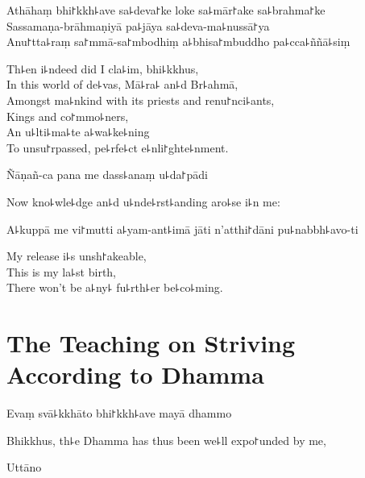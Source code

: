 Athāhaṃ bhi꜓kkh꜕ave sa꜕deva꜓ke loke sa꜕mār꜓ake sa꜕brahma꜓ke\\
Sassamaṇa-brāhmaṇiyā pa꜕jāya sa꜕deva-ma꜕nussā꜓ya\\
Anu꜓tta꜕raṃ sa꜓mmā-sa꜓mbodhiṃ a꜕bhisa꜓mbuddho pa꜕cca꜕ññā꜕siṃ

\begin{english}
  Th꜕en i꜕ndeed did I cla꜕im, bhi꜕kkhus,\\
  In this world of de꜕vas, Mā꜕ra꜕ an꜕d Br꜕ahmā,\\
  Amongst ma꜕nkind with its priests and renu꜓nci꜕ants,\\
  Kings and co꜓mmo꜕ners,\\
  An u꜕lti꜕ma꜕te a꜕wa꜕ke꜕ning\\
  To unsu꜓rpassed, pe꜕rfe꜕ct e꜕nli꜓ghte꜕nment.
\end{english}

Ñāṇañ-ca pana me dass꜕anaṃ u꜕da꜓pādi

\begin{english}
  Now kno꜕wle꜕dge an꜕d u꜕nde꜕rst꜕anding aro꜕se i꜕n me:
\end{english}

A꜕kuppā me vi꜓mutti a꜕yam-ant꜕imā jāti n'atthi꜓dāni pu꜕nabbh꜕avo-ti

\begin{english}
  My release i꜕s unsh꜓akeable,\\
  This is my la꜕st birth,\\
  There won't be a꜕ny꜕ fu꜕rth꜕er be꜕co꜕ming.
\end{english}

\chapter[Striving According to Dhamma]{The Teaching on Striving According to Dhamma}%



\begin{leader}
\end{leader}

Evaṃ svā꜕kkhāto bhi꜓kkh꜕ave mayā dhammo

\begin{english}
  Bhikkhus, th꜕e Dhamma has thus been we꜕ll expo꜓unded by me,
\end{english}

Uttāno


